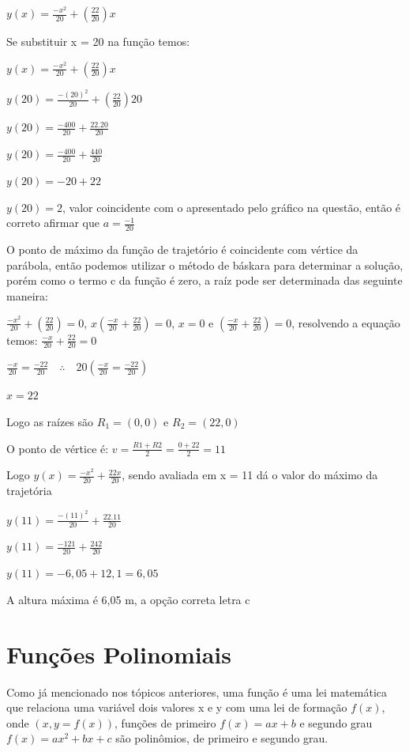 \begin{multicols*}{2}
    $y(x) = \frac{-x^2}{20} + \left(  \frac{22 }{20} \right)x$

    Se substituir x = 20 na função temos:

    $y(x) = \frac{-x^2}{20} + \left(  \frac{22 }{20} \right)x$

    $y(20) = \frac{-(20)^2}{20} + \left(  \frac{22 }{20} \right)20$

    $y(20) = \frac{-400}{20} + \frac{22 . 20}{20}$

    $y(20) = \frac{-400}{20} + \frac{440}{20}$

    $y(20) = -20 + 22$

    $y(20) = 2$, valor coincidente com o apresentado pelo gráfico na questão, então é correto 				afirmar que $a = \frac{-1}{20}$

    O ponto de máximo da função de trajetório é coincidente com vértice da parábola, então podemos 			utilizar o método de báskara para determinar a solução, porém como o termo c da função é zero, 			a raíz pode ser determinada das seguinte maneira:

    $\frac{-x^2}{20} + \left(  \frac{22 }{20} \right) = 0$,
    $x \left(    \frac{-x}{20} + \frac{22}{20} \right) = 0$,
    $x = 0$ e $\left(    \frac{-x}{20} + \frac{22}{20} \right) = 0$, resolvendo a equação temos:
    $    \frac{-x}{20} + \frac{22}{20}  = 0$

    $\frac{-x}{20} = \frac{- 22}{20} \quad \therefore \quad
        20 \left( \frac{-x}{20} = \frac{- 22}{20} \right)$

    $x = 22$

    Logo as raízes são $R_1 = (0,0)$ e $R_2 = (22,0)$

    O ponto de vértice é: $v =\frac{R1 + R2}{2} =\frac{0 + 22}{2} = 11 $

    Logo $y(x) = \frac{-x^2}{20} + \frac{22x}{20}$, sendo avaliada em x = 11 dá o valor do máximo 			da trajetória

    $y(11) = \frac{-(11)^2}{20} + \frac{22.11}{20} $

    $y(11) = \frac{-121}{20} + \frac{242}{20} $

    $y(11) = -6,05 + 12,1  = 6,05 $

    A altura máxima é 6,05 m, a opção correta letra c


    \section{Funções Polinomiais}
    Como já mencionado nos tópicos anteriores, uma função é uma lei matemática que relaciona uma 			variável dois valores x e y com uma lei de formação $f(x)$, onde $(x, y = f(x))$, funções de 			primeiro $f(x) = ax + b$ e segundo grau $f(x) = ax^2 + bx + c$ são polinômios, de primeiro e 			segundo grau.


\end{multicols*}
